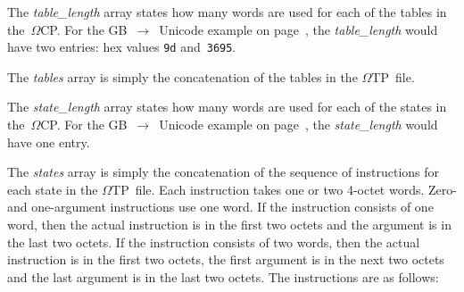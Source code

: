 \documentclass[fleqn]{article}
\newcommand{\OMEGA}{$\Omega$}
\newcommand{\OTP}{\OMEGA TP}
\newcommand{\OCP}{\OMEGA CP}
\begin{document}
The \emph{table\_length} array states how many words are used for each
of the tables in the~\OCP.  For the GB~$\rightarrow$~Unicode example on
page~\pageref{gb:unicode}, the \emph{table\_length} would have two
entries: hex values \texttt{9d} and~\texttt{3695}.

The \emph{tables} array is simply the concatenation of the tables in
the \OTP\ file.

The \emph{state\_length} array states how many words are used for each
of the states in the~\OCP.  For the GB~$\rightarrow$~Unicode example on
page~\pageref{gb:unicode}, the \emph{state\_length} would have one
entry.

The \emph{states} array is simply the concatenation of the sequence of
instructions for each state in the \OTP\ file.  Each instruction takes
one or two 4-octet words.  Zero- and one-argument instructions use
one word. If the instruction consists of one word,
then the actual instruction is in the first two octets and the
argument is in the last two octets.  If the instruction consists of
two words, then the actual instruction is in the first two octets,
the first argument is in the next two octets and the last argument is
in the last two octets.  The instructions are as follows:
\end{document}
